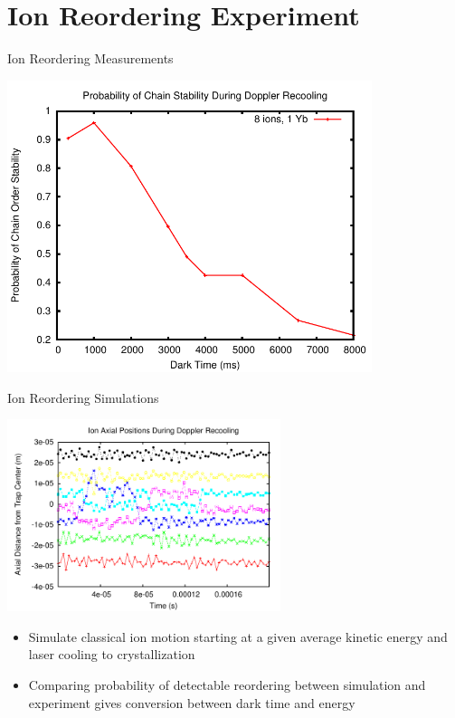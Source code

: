 \documentclass{beamer}
\begin{document}
\section[Reorder]{Ion Reordering Experiment}
\begin{frame}{Ion Reordering Measurements}
\centerline{\includegraphics[width=0.8\textwidth]{data}}
\end{frame}

\begin{frame}{Ion Reordering Simulations}
\centerline{\includegraphics[width=0.6\textwidth]{simulation}}
\begin{itemize}
	\item Simulate classical ion motion starting at a given average kinetic energy and laser cooling to crystallization
	\item Comparing probability of detectable reordering between simulation and experiment gives conversion between dark time and energy
\end{itemize}
\end{frame}
\end{document}
